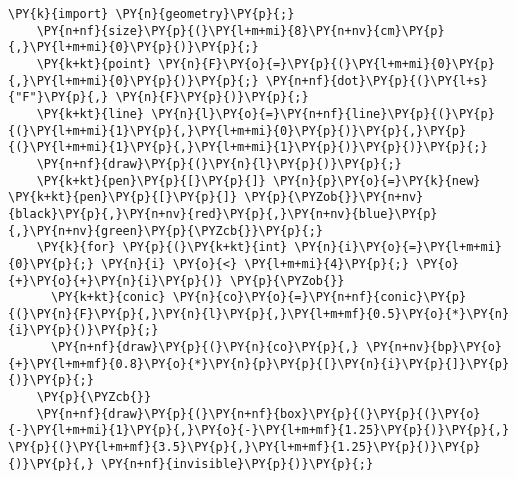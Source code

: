 \begin{Verbatim}[commandchars=\\\{\}]
    \PY{k}{import} \PY{n}{geometry}\PY{p}{;}
    \PY{n+nf}{size}\PY{p}{(}\PY{l+m+mi}{8}\PY{n+nv}{cm}\PY{p}{,}\PY{l+m+mi}{0}\PY{p}{)}\PY{p}{;}
    \PY{k+kt}{point} \PY{n}{F}\PY{o}{=}\PY{p}{(}\PY{l+m+mi}{0}\PY{p}{,}\PY{l+m+mi}{0}\PY{p}{)}\PY{p}{;} \PY{n+nf}{dot}\PY{p}{(}\PY{l+s}{"F"}\PY{p}{,} \PY{n}{F}\PY{p}{)}\PY{p}{;}
    \PY{k+kt}{line} \PY{n}{l}\PY{o}{=}\PY{n+nf}{line}\PY{p}{(}\PY{p}{(}\PY{l+m+mi}{1}\PY{p}{,}\PY{l+m+mi}{0}\PY{p}{)}\PY{p}{,}\PY{p}{(}\PY{l+m+mi}{1}\PY{p}{,}\PY{l+m+mi}{1}\PY{p}{)}\PY{p}{)}\PY{p}{;}
    \PY{n+nf}{draw}\PY{p}{(}\PY{n}{l}\PY{p}{)}\PY{p}{;}
    \PY{k+kt}{pen}\PY{p}{[}\PY{p}{]} \PY{n}{p}\PY{o}{=}\PY{k}{new} \PY{k+kt}{pen}\PY{p}{[}\PY{p}{]} \PY{p}{\PYZob{}}\PY{n+nv}{black}\PY{p}{,}\PY{n+nv}{red}\PY{p}{,}\PY{n+nv}{blue}\PY{p}{,}\PY{n+nv}{green}\PY{p}{\PYZcb{}}\PY{p}{;}
    \PY{k}{for} \PY{p}{(}\PY{k+kt}{int} \PY{n}{i}\PY{o}{=}\PY{l+m+mi}{0}\PY{p}{;} \PY{n}{i} \PY{o}{<} \PY{l+m+mi}{4}\PY{p}{;} \PY{o}{+}\PY{o}{+}\PY{n}{i}\PY{p}{)} \PY{p}{\PYZob{}}
      \PY{k+kt}{conic} \PY{n}{co}\PY{o}{=}\PY{n+nf}{conic}\PY{p}{(}\PY{n}{F}\PY{p}{,}\PY{n}{l}\PY{p}{,}\PY{l+m+mf}{0.5}\PY{o}{*}\PY{n}{i}\PY{p}{)}\PY{p}{;}
      \PY{n+nf}{draw}\PY{p}{(}\PY{n}{co}\PY{p}{,} \PY{n+nv}{bp}\PY{o}{+}\PY{l+m+mf}{0.8}\PY{o}{*}\PY{n}{p}\PY{p}{[}\PY{n}{i}\PY{p}{]}\PY{p}{)}\PY{p}{;}
    \PY{p}{\PYZcb{}}
    \PY{n+nf}{draw}\PY{p}{(}\PY{n+nf}{box}\PY{p}{(}\PY{p}{(}\PY{o}{-}\PY{l+m+mi}{1}\PY{p}{,}\PY{o}{-}\PY{l+m+mf}{1.25}\PY{p}{)}\PY{p}{,} \PY{p}{(}\PY{l+m+mf}{3.5}\PY{p}{,}\PY{l+m+mf}{1.25}\PY{p}{)}\PY{p}{)}\PY{p}{,} \PY{n+nf}{invisible}\PY{p}{)}\PY{p}{;}
\end{Verbatim}
